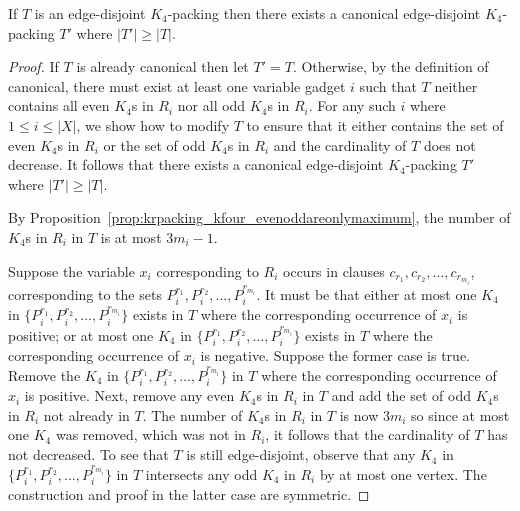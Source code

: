 \begin{lem}
If $T$ is an edge-disjoint $K_4$-packing then there exists a canonical edge-disjoint $K_4$-packing $T'$ where $|T'| \geq |T|$.
\label{lem:krpacking_four_canonical}
\end{lem}
\begin{proof}
If $T$ is already canonical then let $T'=T$. Otherwise, by the definition of canonical, there must exist at least one variable gadget $i$ such that $T$ neither contains all even $K_4$s in $R_i$ nor all odd $K_4$s in $R_i$. For any such $i$ where $1\leq i \leq |X|$, we show how to modify $T$ to ensure that it either contains the set of even $K_4$s in $R_i$ or the set of odd $K_4$s in $R_i$ and the cardinality of $T$ does not decrease. It follows that there exists a canonical edge-disjoint $K_4$-packing $T'$ where $|T'| \geq |T|$. 

By Proposition~\ref{prop:krpacking_kfour_evenoddareonlymaximum}, the number of $K_4$s in $R_i$ in $T$ is at most $3 m_i - 1$. 

Suppose the variable $x_i$ corresponding to $R_i$ occurs in clauses $c_{r_1}, c_{r_2}, \dots, c_{r_{m_i}}$, corresponding to the sets $P_i^{r_1}, P_i^{r_2}, \dots, P_i^{r_{m_i}}$. It must be that either at most one $K_4$ in $\{ P_i^{r_1}, P_i^{r_2}, \dots, P_i^{r_{m_i}} \}$ exists in $T$ where the corresponding occurrence of $x_i$ is positive; or at most one $K_4$ in $\{ P_i^{r_1}, P_i^{r_2}, \dots, P_i^{r_{m_i}} \}$ exists in $T$ where the corresponding occurrence of $x_i$ is negative. Suppose the former case is true. Remove the $K_4$ in $\{ P_i^{r_1}, P_i^{r_2}, \dots, P_i^{r_{m_i}} \}$ in $T$ where the corresponding occurrence of $x_i$ is positive. Next, remove any even $K_4$s in $R_i$ in $T$ and add the set of odd $K_4$s in $R_i$ not already in $T$. The number of $K_4$s in $R_i$ in $T$ is now $3 m_i$ so since at most one $K_4$ was removed, which was not in $R_i$, it follows that the cardinality of $T$ has not decreased. To see that $T$ is still edge-disjoint, observe that any $K_4$ in $\{ P_i^{r_1}, P_i^{r_2}, \dots, P_i^{r_{m_i}} \}$ in $T$ intersects any odd $K_4$ in $R_i$ by at most one vertex. The construction and proof in the latter case are symmetric.
\end{proof}

